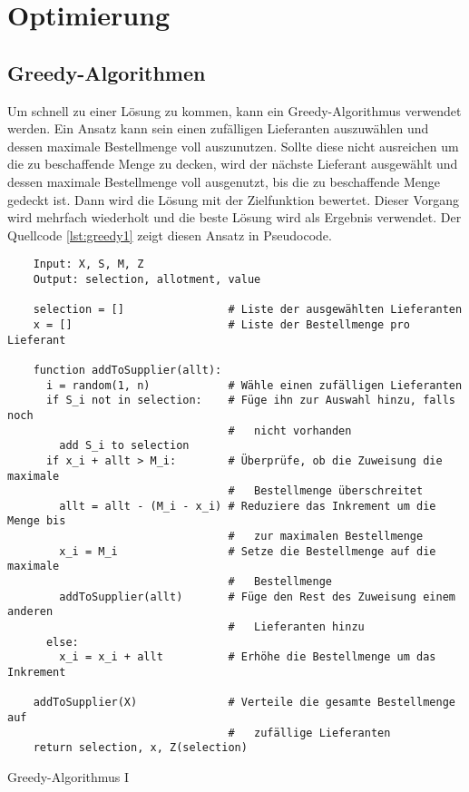 \section{Optimierung}\label{sec:optimization}

\subsection{Greedy-Algorithmen}\label{subsec:greedy}

Um schnell zu einer Lösung zu kommen, kann ein Greedy-Algorithmus verwendet werden.
Ein Ansatz kann sein einen zufälligen Lieferanten auszuwählen und dessen maximale Bestellmenge voll auszunutzen.
Sollte diese nicht ausreichen um die zu beschaffende Menge zu decken, wird der nächste Lieferant ausgewählt und dessen maximale Bestellmenge voll ausgenutzt, bis die zu beschaffende Menge gedeckt ist.
Dann wird die Lösung mit der Zielfunktion bewertet.
Dieser Vorgang wird mehrfach wiederholt und die beste Lösung wird als Ergebnis verwendet.
Der Quellcode \ref{lst:greedy1} zeigt diesen Ansatz in Pseudocode.

\begin{longlisting}
  \begin{verbatim}
    Input: X, S, M, Z
    Output: selection, allotment, value
  
    selection = []                # Liste der ausgewählten Lieferanten
    x = []                        # Liste der Bestellmenge pro Lieferant
  
    function addToSupplier(allt):
      i = random(1, n)            # Wähle einen zufälligen Lieferanten
      if S_i not in selection:    # Füge ihn zur Auswahl hinzu, falls noch 
                                  #   nicht vorhanden
        add S_i to selection
      if x_i + allt > M_i:        # Überprüfe, ob die Zuweisung die maximale 
                                  #   Bestellmenge überschreitet
        allt = allt - (M_i - x_i) # Reduziere das Inkrement um die Menge bis 
                                  #   zur maximalen Bestellmenge
        x_i = M_i                 # Setze die Bestellmenge auf die maximale 
                                  #   Bestellmenge
        addToSupplier(allt)       # Füge den Rest des Zuweisung einem anderen 
                                  #   Lieferanten hinzu
      else:
        x_i = x_i + allt          # Erhöhe die Bestellmenge um das Inkrement
  
    addToSupplier(X)              # Verteile die gesamte Bestellmenge auf
                                  #   zufällige Lieferanten
    return selection, x, Z(selection)
  \end{verbatim}
  \caption{Greedy-Algorithmus I}\label{lst:greedy1}
\end{longlisting}

